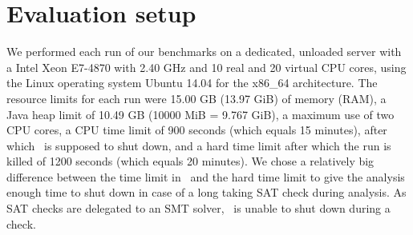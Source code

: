 \section{Evaluation setup}
We performed each run of our benchmarks on a dedicated, unloaded server with a Intel Xeon E7-4870 with 2.40 GHz and 10 real and 20 virtual CPU cores, using the Linux operating system Ubuntu 14.04 for the x86\_64 architecture.
The resource limits for each run were 15.00 GB (13.97 GiB) of memory (RAM), a Java heap limit of 10.49 GB (10000 MiB = 9.767 GiB),
a maximum use of two CPU cores,
a CPU time limit of 900 seconds (which equals 15 minutes), after which \cpaChecker\ is supposed to shut down,
and a hard time limit after which the run is killed of 1200 seconds (which equals 20 minutes).
We chose a relatively big difference between the time limit in \cpaChecker\ and the hard time limit to give the analysis enough time to shut down in case of a long taking SAT check during analysis.
As SAT checks are delegated to an SMT solver, \cpaChecker\ is unable to shut down during a check.


